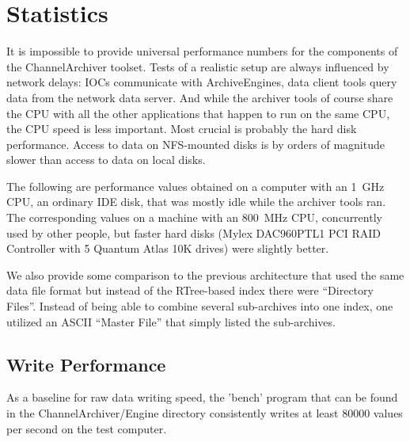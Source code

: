 \section{Statistics}
It is impossible to provide universal performance numbers for the
components of the ChannelArchiver toolset. Tests of a realistic setup
are always influenced by network delays: IOCs communicate with ArchiveEngines,
data client tools query data from the network data server.
And while the archiver tools of course share the CPU with all the
other applications that happen to run on the same CPU,
the CPU speed is less important. Most crucial is probably the hard
disk performance. Access to data on NFS-mounted disks is by orders of
magnitude slower than access to data on local disks.

The following are performance values obtained on a computer
with an 1~GHz CPU, an ordinary IDE disk, that was mostly idle
while the archiver tools ran. %
The corresponding values on a machine with an 800~MHz CPU, concurrently
used by other people, but faster hard disks (Mylex
DAC960PTL1 PCI RAID Controller with 5 Quantum Atlas 10K drives) were
slightly better.

We also provide some comparison to the previous architecture that used
the same data file format but instead of the RTree-based index there
were ``Directory Files''. Instead of being able to combine several sub-archives
into one index, one utilized an ASCII ``Master File'' that simply listed the
sub-archives.

\subsection{Write Performance}
As a baseline for raw data writing speed, the 'bench' program that can
be found in the ChannelArchiver/Engine directory consistently writes
at least 80000 values per second on the test computer.

